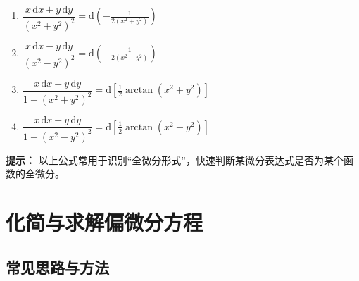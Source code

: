 \begin{multicols}{2}
\begin{enumerate}
        \item $\dfrac{x\,\mathrm{d}x + y\,\mathrm{d}y}{(x^{2}+y^{2})^{2}} = \mathrm{d}\!\left(-\frac{1}{2(x^{2}+y^{2})}\right)$
        \item $\dfrac{x\,\mathrm{d}x - y\,\mathrm{d}y}{(x^{2}-y^{2})^{2}} = \mathrm{d}\!\left(-\frac{1}{2(x^{2}-y^{2})}\right)$
        \item $\dfrac{x\,\mathrm{d}x + y\,\mathrm{d}y}{1+(x^{2}+y^{2})^{2}} = \mathrm{d}\!\left[\frac{1}{2}\arctan(x^{2}+y^{2})\right]$
        \item $\dfrac{x\,\mathrm{d}x - y\,\mathrm{d}y}{1+(x^{2}-y^{2})^{2}} = \mathrm{d}\!\left[\frac{1}{2}\arctan(x^{2}-y^{2})\right]$
    \end{enumerate}
\end{multicols}

\textbf{提示：}
以上公式常用于识别“全微分形式”，快速判断某微分表达式是否为某个函数的全微分。

\section{化简与求解偏微分方程}

\subsection{常见思路与方法}

